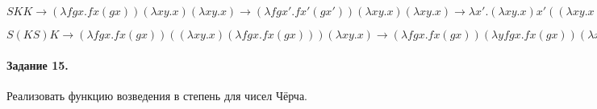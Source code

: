 \documentclass[a4paper,12pt]{article}
\begin{document}
\begin{Solution}

$SKK \rightarrow \left(\lambda fgx . fx\left(gx\right)\right)\left(\lambda xy . x\right)\left(\lambda xy . x\right) \rightarrow \left(\lambda fgx' . fx'\left(gx'\right)\right)\left(\lambda xy . x\right)\left(\lambda xy . x\right) \rightarrow \lambda x' . \left(\lambda xy . x\right)x'\left(\left(\lambda xy . x\right)x'\right) \rightarrow \lambda x' . \left(\lambda xy . x\right)x'\left(\lambda y . x'\right) \rightarrow \lambda x' . x' = I$

$S\left(KS\right)K \rightarrow \left(\lambda fgx . fx\left(gx\right)\right)\left(\left(\lambda xy . x\right)\left(\lambda fgx . fx\left(gx\right)\right)\right)\left(\lambda xy . x\right) \rightarrow \left(\lambda fgx . fx\left(gx\right)\right)\left(\lambda yfgx . fx\left(gx\right)\right)\left(\lambda xy . x\right) \rightarrow \left(\lambda f'g'x' . f'x'\left(g'x'\right)\right)\left(\lambda yfgx . fx\left(gx\right)\right)\left(\lambda xy . x\right) \rightarrow \lambda x' . \left(\lambda yfgx . fx\left(gx\right)\right)x'\left(\left(\lambda xy . x\right)x'\right) \rightarrow \lambda x' . \left(\lambda yfgx . fx\left(gx\right)\right)x'\left(\lambda y . x'\right) \rightarrow \lambda x' . \left(\lambda fgx . fx\left(gx\right)\right)\left(\lambda y . x'\right) \rightarrow \lambda x' . \left(\lambda gx . \left(\lambda y . x'\right)x\left(gx\right)\right) \rightarrow \lambda x' . \left(\lambda gx . x'\left(gx\right)\right) \rightarrow \lambda x'gx . x'\left(gx\right) = B$

\end{Solution}

\paragraph{Задание 15.} Реализовать функцию возведения в степень для чисел Чёрча.
\end{document}
